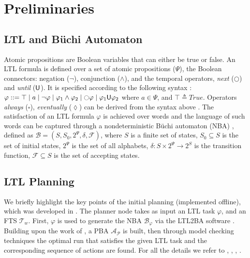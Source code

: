 
\section{Preliminaries} \label{sec:preliminaries}

\subsection{LTL and B\"{u}chi Automaton} \label{subsec:LTL}
Atomic propositions are Boolean variables that can either be true or false. An LTL formula is defined over a set of atomic propositions ($\Psi$), the Boolean connectors: negation ($\neg$), conjunction ($\wedge$), and the temporal operators, \textit{next} ($\Circle$) and \textit{until} ($\mathsf{U}$). It is specified according to the following syntax \cite{model-checking}:
$ \varphi::= \top\mid a\mid\neg\varphi\mid\varphi_1\wedge\varphi_2\mid\Circle\varphi\mid\varphi_1\until\varphi_2$ where $a\in\Psi$, and $\top\triangleq True$. Operators \textit{always} ($\square$), \textit{eventually} ($\lozenge$) can be derived from the syntax above \cite[Ch. 5]{model-checking}. The satisfaction of an LTL formula $\varphi$ is achieved over words and the language of such words can be captured through a nondeterministic B\"{u}chi automaton (NBA) \cite{buchi_book}, defined as $\mathcal{B}=\left(S, S_0,  2^{\Psi}, \delta, \mathcal{F}\right)$, where $S$ is a finite set of states, $S_{0} \subseteq S$ is the set of initial states, $2^{\Psi}$ is the set of all alphabets, $\delta: S \times 2^{\Psi} \rightarrow 2^{S}$ is the transition function, $\mathcal{F} \subseteq S$ is the set of accepting states.

\subsection{LTL Planning}\label{subsec:planning}
We briefly highlight the key points of the initial planning (implemented offline), which was developed in \cite{ltl_planner}. The planner node takes as input an LTL
task $\varphi$, and an FTS $\mathcal{T}_w$. First, $\varphi$ is used to generate the NBA $\mathcal{B}_{\varphi}$ via the LTL2BA software \cite{LTL2BA}. Building upon the work of \cite{ltl_planner_2}, a PBA $\mathcal{A_P}$ \cite{ltl_planner} is built, then through model checking techniques \cite{ltl_planner_3} the optimal run that satisfies the given LTL task and the corresponding sequence of actions are found. For all the details we refer to \cite{ltl_planner}, \cite{ltl_planner_2}, \cite{ltl_planner_3}, \cite{meng_paper}.